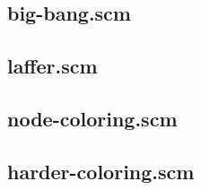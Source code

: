 \documentclass[12pt,a4paper]{article}
\begin{document}
\subsection{big-bang.scm}

\subsection{laffer.scm}

\subsection{node-coloring.scm}

\subsection{harder-coloring.scm}

\end{document}
